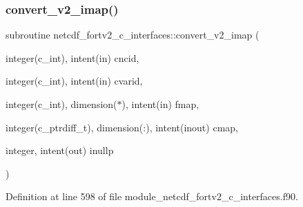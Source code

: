 \subsubsection{\texorpdfstring{convert\+\_\+v2\+\_\+imap()}{convert\_v2\_imap()}}
{\footnotesize\ttfamily subroutine netcdf\+\_\+fortv2\+\_\+c\+\_\+interfaces\+::convert\+\_\+v2\+\_\+imap (\begin{DoxyParamCaption}\item[{integer(c\+\_\+int), intent(in)}]{cncid,  }\item[{integer(c\+\_\+int), intent(in)}]{cvarid,  }\item[{integer(c\+\_\+int), dimension($\ast$), intent(in)}]{fmap,  }\item[{integer(c\+\_\+ptrdiff\+\_\+t), dimension(\+:), intent(inout)}]{cmap,  }\item[{integer, intent(out)}]{inullp }\end{DoxyParamCaption})}



Definition at line 598 of file module\+\_\+netcdf\+\_\+fortv2\+\_\+c\+\_\+interfaces.\+f90.


